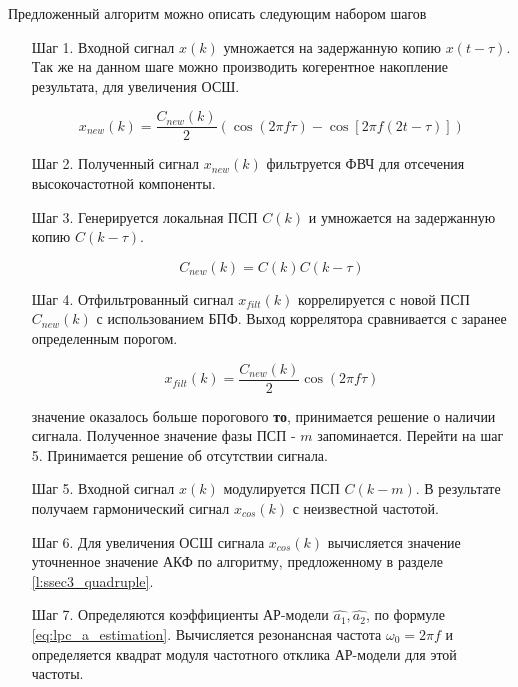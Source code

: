 Предложенный алгоритм можно описать следующим набором шагов
\begin{itemize}
\item[Шаг 1.] Входной сигнал ${x(k)}$ умножается на задержанную копию ${x(t-\tau)}$. Так же
	на данном шаге можно производить когерентное накопление результата, для
	увеличения ОСШ.

	\begin{center}
	\begin{equation}
		x_{new}(k) = \frac{C_{new}(k)}{2} \left(\cos (2\pi f \tau) - \cos \left[2 \pi f (2t - \tau)\right]\right)
	\end{equation}
	\end{center}

\item[Шаг 2.] Полученный сигнал ${x_{new}(k)}$ фильтруется ФВЧ для отсечения высокочастотной компоненты.
\item[Шаг 3.] Генерируется локальная ПСП ${C(k)}$ и умножается на задержанную копию ${C(k-\tau)}$.

	\begin{center}
	\begin{equation}
		C_{new}(k) = C(k)C(k-\tau)
	\end{equation}
	\end{center}

\item[Шаг 4.] Отфильтрованный сигнал ${x_{filt}(k)}$ коррелируется с новой ПСП ${C_{new}(k)}$
	с использованием БПФ. Выход коррелятора сравнивается с заранее определенным порогом.

	\begin{center}
	\begin{equation}
		x_{filt}(k) = \frac{C_{new}(k)}{2} \cos (2\pi f \tau)
	\end{equation}
	\end{center}

	  значение оказалось больше порогового {\bf{то}},
		принимается решение о наличии сигнала. Полученное значение фазы ПСП  - ${m}$ запоминается.
		Перейти на шаг 5.
		Принимается решение об отсутствии сигнала.
\item[Шаг 5.] Входной сигнал ${x(k)}$ модулируется ПСП ${C(k-m)}$. В результате получаем гармонический
	сигнал ${x_{cos}(k)}$ с неизвестной частотой.
\item[Шаг 6.] Для увеличения ОСШ сигнала ${x_{cos}(k)}$ вычисляется значение уточненное значение АКФ
	по алгоритму, предложенному в разделе \ref{l:ssec3_quadruple}.
\item[Шаг 7.] Определяются коэффициенты АР-модели ${\hat{a_1}, \hat{a_2}}$, по формуле \ref{eq:lpc_a_estimation}. 
	Вычисляется резонансная частота ${\omega_0 = 2 \pi f}$ и определяется квадрат модуля частотного отклика АР-модели для этой частоты. 
\end{itemize}

